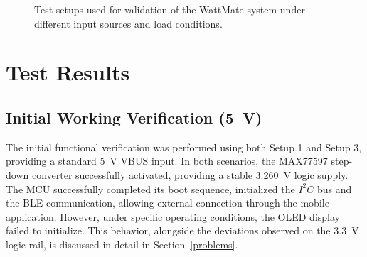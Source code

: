 \begin{figure}[H]
\begin{tikzpicture}[
    block/.style={draw, rounded corners, minimum width=3cm, minimum height=0.9cm, align=center},
    arrow/.style={->, thick}
]
\end{tikzpicture}

\vspace{0.6cm}


\caption{Test setups used for validation of the WattMate system under different input sources and load conditions.}
\label{fig:wattmate_setups}
\end{figure}



\section{Test Results}

\subsection{Initial Working Verification (\SI{5}{\volt})}
The initial functional verification was performed using both Setup 1 and Setup 3, providing a standard \SI{5}{\volt} VBUS input. In both scenarios, the MAX77597 step-down converter successfully activated, providing a stable \SI{3.260}{\volt} logic supply. The MCU successfully completed its boot sequence, initialized the $I^2C$ bus and the BLE communication, allowing external connection through the mobile application. However, under specific operating conditions, the OLED display failed to initialize. This behavior, alongside the deviations observed on the \SI{3.3}{\volt} logic rail, is discussed in detail in Section~\ref{problems}.

